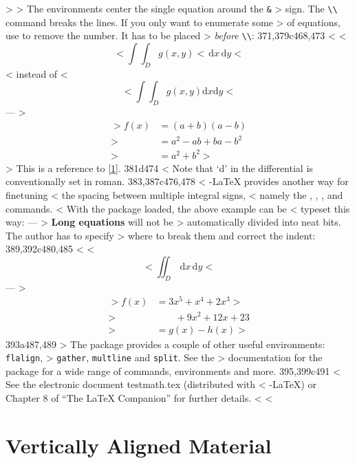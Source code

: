 \begin{example}
> 
> The  environments center the single equation around the \verb|&|
> sign. The \verb|\\| command breaks the lines. If you only want to enumerate some
> of equations, use  to remove the number. It has to be placed
> \emph{before} \verb|\\|:
371,379c468,473
< \newcommand{\ud}{\mathrm{d}}
< \begin{displaymath}
< \int\!\!\!\int_{D} g(x,y)
<   \, \ud x\, \ud y 
< \end{displaymath}
< instead of 
< \begin{displaymath}
< \int\int_{D} g(x,y)\ud x \ud y
< \end{displaymath}
---
> \begin{align}
> f(x) &= (a+b)(a-b) \label{1}\\
>      &= a^2-ab+ba-b^2  \\ 
>      &= a^2+b^2 \tag{wrong}
> \end{align}
> This is a reference to \eqref{1}.
381d474
< Note that `d' in the differential is conventionally set in roman.
383,387c476,478
< \AmS-\LaTeX{} provides another way for finetuning
< the spacing between multiple integral signs,
< namely the , , , and  commands.
< With the  package loaded, the above example can be
< typeset this way:
---
>  \textbf{Long equations} will not be
> automatically divided into neat bits.  The author has to specify
> where to break them and correct the indent:
389,392c480,485
< \newcommand{\ud}{\mathrm{d}}
< \begin{displaymath}
< \iint_{D} \, \ud x \, \ud y
< \end{displaymath}
---
> \begin{align}
> f(x) &= 3x^5 + x^4 + 2x^3 
>                 \nonumber \\
>      &\qquad + 9x^2 + 12x + 23 \\
>      &= g(x) - h(x)
> \end{align}
393a487,489
> The  package provides a couple of other useful environments: \verb|flalign|,
> \verb|gather|, \verb|multline| and \verb|split|. See the
> documentation for the package for a wide range of commands, environments and more.
395,399c491
< See the electronic document testmath.tex (distributed with
< \AmS-\LaTeX) or Chapter 8 of ``The LaTeX Companion'' for further details.
< 
< \section{Vertically Aligned Material}

\end{example}
